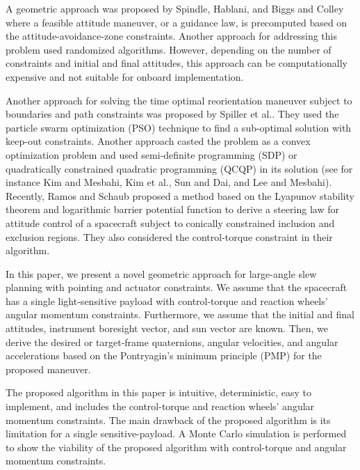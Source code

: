 \documentclass[letterpaper, preprint, paper,11pt]{AAS}	%
\begin{document}
	A geometric approach was proposed by Spindle\cite{Spindler1998}, Hablani\cite{Hablani1998}, and Biggs and Colley\cite{Biggs2016}  where a feasible attitude maneuver, or a guidance law, is precomputed based on the attitude-avoidance-zone constraints.  Another approach for addressing this problem used randomized algorithms\cite{Frazzoli01}. However, depending on the number of constraints and initial and final attitudes, this approach can be computationally expensive and not suitable for onboard implementation. 
	
	Another approach for solving the time optimal reorientation maneuver subject to boundaries and path constraints was proposed by Spiller et al.\cite{Spiller2016}. They used the particle swarm optimization (PSO) technique to find a sub-optimal solution with keep-out constraints. Another approach casted the problem as a convex optimization problem and used semi-definite programming (SDP) or quadratically constrained quadratic programming (QCQP) in its solution (see for instance Kim and Mesbahi\cite{Kim2004}, Kim et al.\cite{Kim2010}, Sun and Dai\cite{Sun2015}, and Lee and Mesbahi\cite{Lee2014}). Recently, Ramos and Schaub\cite{Ramos2018} proposed a method based on the Lyapunov stability theorem and logarithmic barrier potential function to derive a steering law for attitude control of a spacecraft subject to conically constrained inclusion and exclusion regions. They also considered the control-torque constraint in their algorithm.  
	
	In this paper, we present a novel geometric approach for large-angle slew planning with pointing and actuator constraints.  We assume that the spacecraft has a single light-sensitive payload with control-torque and reaction wheels' angular momentum constraints. Furthermore, we assume that the initial and final attitudes, instrument boresight vector, and sun vector are known. Then, we derive the desired or target-frame quaternions, angular velocities, and angular accelerations based on the Pontryagin's minimum principle (PMP) for the proposed maneuver. 
	
	The proposed algorithm in this paper is intuitive, deterministic, easy to implement, and includes the control-torque and reaction wheels' angular momentum constraints. The main drawback of the proposed algorithm is its limitation for a single sensitive-payload.  A Monte Carlo simulation is performed to show the viability of the proposed algorithm with control-torque and angular momentum constraints. 
	
\end{document}
